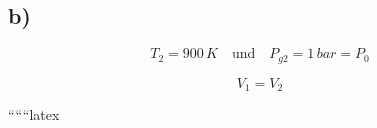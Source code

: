 

\subsection*{b)}

\[
T_2 = 900 \, K \quad \text{und} \quad P_{g2} = 1 \, bar = P_0
\]

\[
V_1 = V_2
\]

``````latex